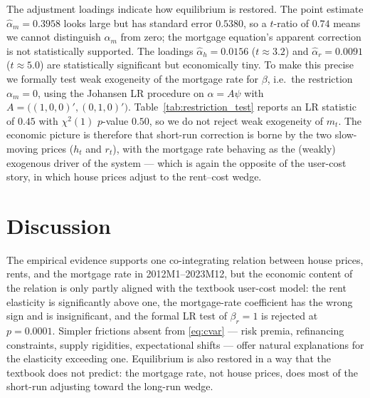 \documentclass[12pt]{article}
\begin{document}
The adjustment loadings indicate how equilibrium is restored. The point estimate $\hat\alpha_m=0.3958$ looks large but has standard error $0.5380$, so a $t$-ratio of $0.74$ means we cannot distinguish $\alpha_m$ from zero; the mortgage equation's apparent correction is not statistically supported. The loadings $\hat\alpha_h=0.0156$ ($t\approx 3.2$) and $\hat\alpha_r=0.0091$ ($t\approx 5.0$) are statistically significant but economically tiny. To make this precise we formally test weak exogeneity of the mortgage rate for $\beta$, i.e.\ the restriction $\alpha_m=0$, using the Johansen LR procedure on $\alpha = A\psi$ with $A=\bigl((1,0,0)',(0,1,0)'\bigr)$. Table~\ref{tab:restriction_test} reports an LR statistic of $0.45$ with $\chi^2(1)$ $p$-value $0.50$, so we do not reject weak exogeneity of $m_t$. The economic picture is therefore that short-run correction is borne by the two slow-moving prices ($h_t$ and $r_t$), with the mortgage rate behaving as the (weakly) exogenous driver of the system --- which is again the opposite of the user-cost story, in which house prices adjust to the rent--cost wedge.



\section{Discussion}

The empirical evidence supports one co-integrating relation between house prices, rents, and the mortgage rate in 2012M1--2023M12, but the economic content of the relation is only partly aligned with the textbook user-cost model: the rent elasticity is significantly above one, the mortgage-rate coefficient has the wrong sign and is insignificant, and the formal LR test of $\beta_r=1$ is rejected at $p=0.0001$. Simpler frictions absent from \eqref{eq:cvar} --- risk premia, refinancing constraints, supply rigidities, expectational shifts --- offer natural explanations for the elasticity exceeding one. Equilibrium is also restored in a way that the textbook does not predict: the mortgage rate, not house prices, does most of the short-run adjusting toward the long-run wedge.


\end{document}
